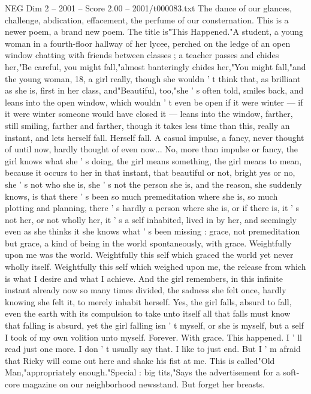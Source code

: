\begin{textsample}{NEG Dim 2 – 2001 – Score 2.00 – 2001/t000083.txt}
The dance of our glances, challenge, abdication, effacement, the perfume of our consternation.
This is a newer poem, a brand new poem.
The title is"This Happened."A student, a young woman in a fourth-floor hallway of her lycee, perched on the ledge of an open window chatting with friends between classes ; a teacher passes and chides her,"Be careful, you might fall,"almost banteringly chides her,"You might fall,"and the young woman, 18, a girl really, though she wouldn ' t think that, as brilliant as she is, first in her class, and"Beautiful, too,"she ' s often told, smiles back, and leans into the open window, which wouldn ' t even be open if it were winter — if it were winter someone would have closed it — leans into the window, farther, still smiling, farther and farther, though it takes less time than this, really an instant, and lets herself fall.
Herself fall.
A casual impulse, a fancy, never thought of until now, hardly thought of even now...
No, more than impulse or fancy, the girl knows what she ' s doing, the girl means something, the girl means to mean, because it occurs to her in that instant, that beautiful or not, bright yes or no, she ' s not who she is, she ' s not the person she is, and the reason, she suddenly knows, is that there ' s been so much premeditation where she is, so much plotting and planning, there ' s hardly a person where she is, or if there is, it ' s not her, or not wholly her, it ' s a self inhabited, lived in by her, and seemingly even as she thinks it she knows what ' s been missing : grace, not premeditation but grace, a kind of being in the world spontaneously, with grace.
Weightfully upon me was the world.
Weightfully this self which graced the world yet never wholly itself.
Weightfully this self which weighed upon me, the release from which is what I desire and what I achieve.
And the girl remembers, in this infinite instant already now so many times divided, the sadness she felt once, hardly knowing she felt it, to merely inhabit herself.
Yes, the girl falls, absurd to fall, even the earth with its compulsion to take unto itself all that falls must know that falling is absurd, yet the girl falling isn ' t myself, or she is myself, but a self I took of my own volition unto myself.
Forever.
With grace.
This happened.
I ' ll read just one more.
I don ' t usually say that.
I like to just end.
But I ' m afraid that Ricky will come out here and shake his fist at me.
This is called"Old Man,"appropriately enough."Special : big tits,"Says the advertisement for a soft-core magazine on our neighborhood newsstand.
But forget her breasts.

\end{textsample}
